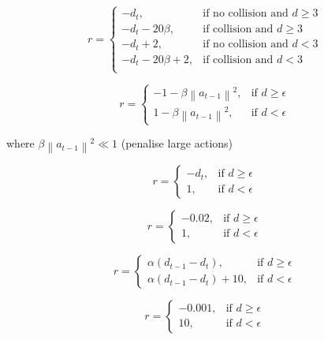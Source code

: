 \documentclass{article}
\newcommand{\norm}[1]{\left\lVert#1\right\rVert}
\begin{document}
\begin{equation}
r = \begin{cases}
    -d_t, & \text{if no collision and $d \geq 3$}\\
    -d_t - 20\beta , & \text{if collision and $d \geq 3$}\\
    -d_t + 2 , & \text{if no collision and $d < 3$} \\
    -d_t - 20\beta + 2, & \text{if collision and $d < 3$}\\
  \end{cases}
\end{equation}

\begin{equation}
r = \begin{cases}
    - 1 - \beta \norm{a_{t-1}}^2, & \text{if $d \geq \epsilon $}\\
    1 - \beta \norm{a_{t-1}}^2, & \text{if $d < \epsilon $}
  \end{cases}
\end{equation}

where $\beta \norm{a_{t-1}}^2 \ll 1$ (penalise large actions)

\begin{equation}
r = \begin{cases}
    - d_t , & \text{if $d \geq \epsilon $}\\
    1 , & \text{if $d < \epsilon $}
  \end{cases}
\end{equation}

\begin{equation}
r = \begin{cases}
    - 0.02 , & \text{if $d \geq \epsilon $}\\
    1 , & \text{if $d < \epsilon $}
  \end{cases}
\end{equation}

\begin{equation}
r = \begin{cases}
\alpha (d_{t-1} - d_t), & \text{if $d \geq \epsilon $}\\
\alpha (d_{t-1} - d_t) + 10, & \text{if $d < \epsilon $}
  \end{cases}
\end{equation}

\begin{equation}
r = \begin{cases}
    - 0.001 , & \text{if $d \geq \epsilon $}\\
    10 , & \text{if $d < \epsilon $}
  \end{cases}
\end{equation}
\end{document}
